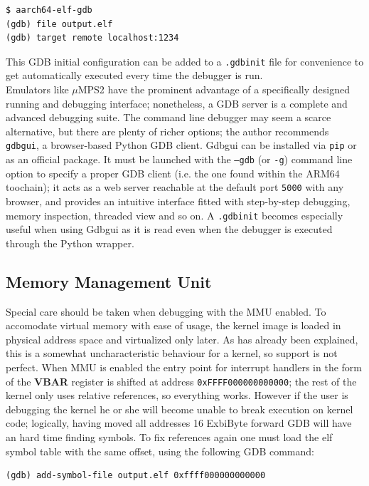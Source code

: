 \documentclass[12pt,a4paper,openright,twoside]{report}
\begin{document}
\begin{lstlisting}[label={lst:gdb}]
$ aarch64-elf-gdb
(gdb) file output.elf
(gdb) target remote localhost:1234
\end{lstlisting}

This GDB initial configuration can be added to a {\tt .gdbinit}
file for convenience to get automatically executed every time the debugger is run.\\

Emulators like $\mu$MPS2 have the prominent advantage of a specifically designed
running and debugging interface; nonetheless, a GDB server is a complete and
advanced debugging suite. The command line debugger may seem a scarce alternative,
but there are plenty of richer options; the author recommends {\tt gdbgui}, 
a browser-based Python GDB client.
Gdbgui can be installed via {\tt pip} or as an official package. It must be launched
with the {\tt --gdb} (or {\tt -g}) command line option to specify a proper GDB
client (i.e. the one found within the ARM64 toochain); it acts as a web server
reachable at the default port {\tt 5000} with any browser, and provides an intuitive
interface fitted with step-by-step debugging, memory inspection, threaded view and
so on.
A {\tt .gdbinit} becomes especially useful when using Gdbgui as it is read even 
when the debugger is executed through the Python wrapper.

\subsection{Memory Management Unit}
Special care should be taken when debugging with the MMU enabled. To accomodate
virtual memory with ease of usage, the kernel image is loaded in physical address
space and virtualized only later. As has already been explained, this is a somewhat
uncharacteristic behaviour for a kernel, so support is not perfect.
When MMU is enabled the entry point for interrupt handlers in the form of the
\textbf{VBAR} register is shifted at address {\tt 0xFFFF000000000000}; the rest
of the kernel only uses relative references, so everything works.
However if the user is debugging the kernel he or she will become unable to break
execution on kernel code; logically, having moved all addresses 16 ExbiByte forward
GDB will have an hard time finding symbols. To fix references again one must
load the elf symbol table with the same offset, using the following GDB command:

\begin{lstlisting}
(gdb) add-symbol-file output.elf 0xffff000000000000
\end{lstlisting}
\end{document}
